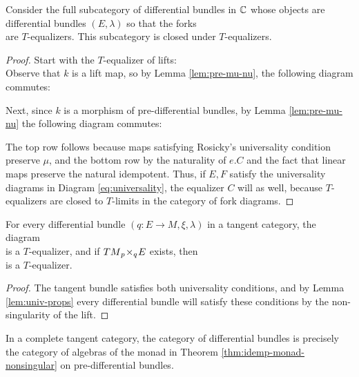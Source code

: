 \begin{lemma}%
  \label{lem:univ-props}
  Consider the full subcategory of differential bundles in $\mathbb{C}$ whose objects are differential bundles $(E,\lambda)$ so that the forks
  \begin{equation}%
    \label{eq:universality}
    
  \end{equation}
  are $T$-equalizers. This subcategory is closed under $T$-equalizers.
\end{lemma}
\begin{proof} 
  Start with the $T$-equalizer of lifts:
  \[\]
  Observe that $k$ is a lift map, so by Lemma \ref{lem:pre-mu-nu}, the following diagram commutes:
  
  Next, since $k$ is a morphism of pre-differential bundles, by Lemma \ref{lem:pre-mu-nu} the following diagram commutes:
  
  The top row follows because maps satisfying Rosicky's universality condition preserve $\mu$, and the bottom row by the naturality of $e.C$ and the fact that linear maps preserve the natural idempotent. Thus, if $E,F$ satisfy the universality diagrams in Diagram \ref{eq:universality}, the equalizer $C$ will as well, because $T$-equalizers are closed to $T$-limits in the category of fork diagrams.
\end{proof}
\begin{theorem}%
  \label{thm:universal-prop-differential-bundles}
  For every differential bundle $(q:E \to M, \xi,\lambda)$ in a tangent category, the diagram \[\] is a $T$-equalizer, and if $TM {_{p}}\!\times_{q}\! E$ exists, then \[\] is a $T$-equalizer.
\end{theorem}
\begin{proof}
  The tangent bundle satisfies both universality conditions, and by Lemma \ref{lem:univ-props} every differential bundle will satisfy these conditions by the non-singularity of the lift.
\end{proof}
\begin{corollary}%
  \label{cor:idemp-dbun}
  In a complete tangent category, the category of differential bundles is precisely the category of algebras of the monad in Theorem \ref{thm:idemp-monad-nonsingular} on pre-differential bundles.
\end{corollary}
